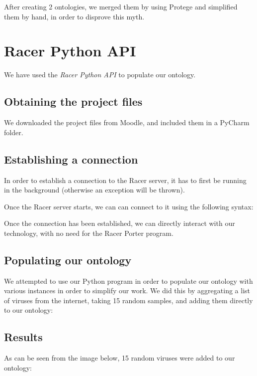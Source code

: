 \documentclass[a4paper,12pt]{report}
\begin{document}
After creating 2 ontologies, we merged them by using Protege and simplified them by hand, in order to disprove this myth.

\chapter{Racer Python API}
We have used the \textit{Racer Python API} to populate our ontology.

\section{Obtaining the project files}
We downloaded the project files from Moodle, and included them in a PyCharm folder.


\begin{center}
\end{center}

\section{Establishing a connection}
In order to establish a connection to the Racer server, it has to first be running in the background (otherwise an exception will be thrown). 

Once the Racer server starts, we can can connect to it using the following syntax:

\begin{center}
\end{center}

Once the connection has been established, we can directly interact with our technology, with no need for the Racer Porter program.

\section{Populating our ontology}
We attempted to use our Python program in order to populate our ontology with various instances in order to simplify our work. We did this by aggregating a list of viruses from the internet, taking 15 random samples, and adding them directly to our ontology:

\begin{center}
\end{center}

\section{Results}
As can be seen from the image below, 15 random viruses were added to our ontology:
\end{document}
